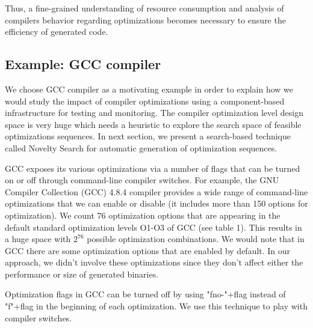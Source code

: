 Thus, a fine-grained understanding of resource
consumption and analysis of compilers behavior regarding
optimizations becomes necessary to ensure the efficiency of generated code.

\subsection{Example: GCC compiler}
We choose GCC compiler as a motivating example in order to explain how we would study the impact of compiler optimizations using a component-based infrastructure for testing and monitoring.
The compiler optimization level design space is very huge which needs a heuristic to explore the search space of feasible optimizations sequences. In next section, we present a search-based technique called Novelty Search for automatic generation of optimization sequences. 

GCC exposes its various optimizations via a number of flags that can be turned on or off through command-line compiler switches. For example, the GNU Compiler Collection (GCC) 4.8.4 compiler provides a wide range of command-line optimizations that we can enable or disable (it includes more than 150 options for optimization). We count 76 optimization options that are appearing in the default standard optimization levels O1-O3 of GCC (see table 1). This results in a huge space with $2^{76}$ possible optimization
combinations.
We would note that in GCC there are some optimization options that are enabled by default. In our approach, we didn't involve these optimizations since they don't affect either the performance or size of generated binaries.

Optimization flags in GCC can be turned off by using "fno-"+flag instead of "f"+flag in the beginning of each optimization. We use this technique to play with compiler switches.

